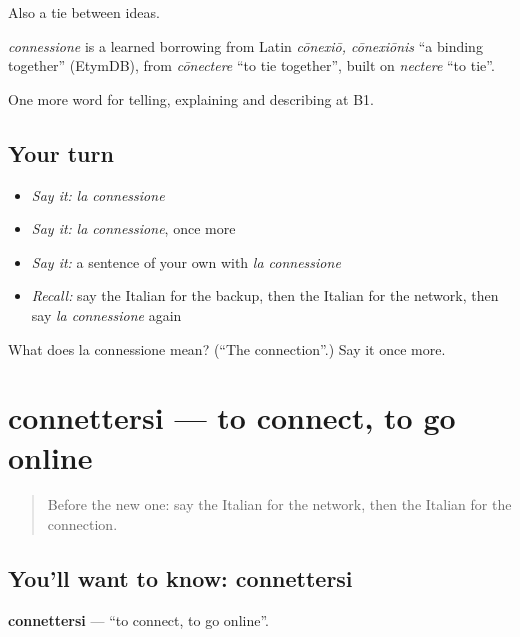 Also a tie between ideas.

\begin{cousinweb}
\emph{connessione} is a learned borrowing from Latin \emph{cōnexiō, cōnexiōnis} \textquotedblleft{}a binding together\textquotedblright{} (EtymDB), from \emph{cōnectere} \textquotedblleft{}to tie together\textquotedblright{}, built on \emph{nectere} \textquotedblleft{}to tie\textquotedblright{}.
\end{cousinweb}

\begin{grammarlens}[title={What you've built}]
One more word for telling, explaining and describing at B1.
\end{grammarlens}

\subsection*{Your turn}
\begin{itemize}
\raggedright
  \item \emph{Say it:} \emph{la connessione}
  \item \emph{Say it:} \emph{la connessione}, once more
  \item \emph{Say it:} a sentence of your own with \emph{la connessione}
  \item \emph{Recall:} say the Italian for the backup, then the Italian for the network, then say \emph{la connessione} again
\end{itemize}

\begin{tcolorbox}[breakable,colback=teal!4,colframe=teal!35!black,title={Before you move on}]
What does la connessione mean? (\textquotedblleft{}The connection\textquotedblright{}.) Say it once more.
\end{tcolorbox}
\section[connettersi]{connettersi — to connect, to go online}

\label{lesson:IT-C402-connettersi}



\begin{quote}
Before the new one: say the Italian for the network, then the Italian for the connection.
\end{quote}

\subsection*{You'll want to know: connettersi}
\textbf{connettersi} — \textquotedblleft{}to connect, to go online\textquotedblright{}.

